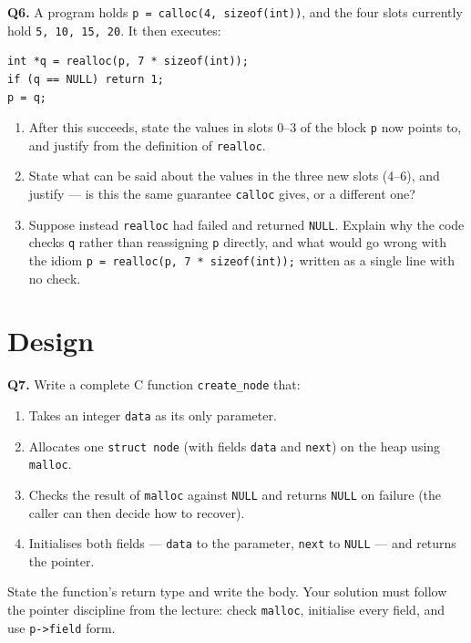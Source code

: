 \documentclass[11pt]{article}
\begin{document}
\textbf{Q6.} A program holds \texttt{p = calloc(4, sizeof(int))}, and the four slots currently hold \texttt{5, 10, 15, 20}. It then executes:
\begin{verbatim}
int *q = realloc(p, 7 * sizeof(int));
if (q == NULL) return 1;
p = q;
\end{verbatim}
\begin{enumerate}
  \item[(a)] After this succeeds, state the values in slots 0--3 of the block \texttt{p} now points to, and justify from the definition of \texttt{realloc}.
  \item[(b)] State what can be said about the values in the three new slots (4--6), and justify --- is this the same guarantee \texttt{calloc} gives, or a different one?
  \item[(c)] Suppose instead \texttt{realloc} had failed and returned \texttt{NULL}. Explain why the code checks \texttt{q} rather than reassigning \texttt{p} directly, and what would go wrong with the idiom \texttt{p = realloc(p, 7 * sizeof(int));} written as a single line with no check.
\end{enumerate}

\section{Design}

\textbf{Q7.} Write a complete C function \texttt{create\_node} that:
\begin{enumerate}
  \item[(a)] Takes an integer \texttt{data} as its only parameter.
  \item[(b)] Allocates one \texttt{struct node} (with fields \texttt{data} and \texttt{next}) on the heap using \texttt{malloc}.
  \item[(c)] Checks the result of \texttt{malloc} against \texttt{NULL} and returns \texttt{NULL} on failure (the caller can then decide how to recover).
  \item[(d)] Initialises both fields --- \texttt{data} to the parameter, \texttt{next} to \texttt{NULL} --- and returns the pointer.
\end{enumerate}
State the function's return type and write the body. Your solution must follow the pointer discipline from the lecture: check \texttt{malloc}, initialise every field, and use \texttt{p->field} form.
\end{document}

